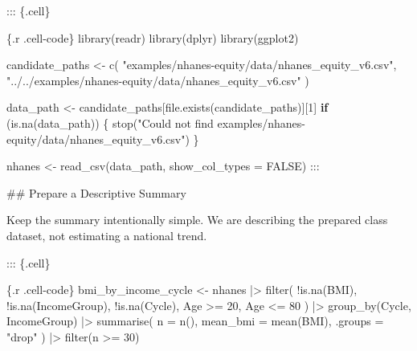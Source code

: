 \documentclass[
  letterpaper,
  DIV=11,
  numbers=noendperiod,
  oneside]{scrreprt}
\newenvironment{Shaded}{\begin{snugshade}}{\end{snugshade}}
\newcommand{\AttributeTok}[1]{\textcolor[rgb]{0.40,0.45,0.13}{#1}}
\newcommand{\ConstantTok}[1]{\textcolor[rgb]{0.56,0.35,0.01}{#1}}
\newcommand{\ControlFlowTok}[1]{\textcolor[rgb]{0.00,0.23,0.31}{\textbf{#1}}}
\newcommand{\DecValTok}[1]{\textcolor[rgb]{0.68,0.00,0.00}{#1}}
\newcommand{\FunctionTok}[1]{\textcolor[rgb]{0.28,0.35,0.67}{#1}}
\newcommand{\InformationTok}[1]{\textcolor[rgb]{0.37,0.37,0.37}{#1}}
\newcommand{\NormalTok}[1]{\textcolor[rgb]{0.00,0.23,0.31}{#1}}
\newcommand{\OtherTok}[1]{\textcolor[rgb]{0.00,0.23,0.31}{#1}}
\newcommand{\SpecialCharTok}[1]{\textcolor[rgb]{0.37,0.37,0.37}{#1}}
\newcommand{\StringTok}[1]{\textcolor[rgb]{0.13,0.47,0.30}{#1}}
\begin{document}
\begin{Shaded}
\begin{Highlighting}[numbers=left,,]
\NormalTok{::: \{.cell\}}

\InformationTok{\textasciigrave{}\textasciigrave{}\textasciigrave{}\{.r .cell{-}code\}}
\FunctionTok{library}\NormalTok{(readr)}
\FunctionTok{library}\NormalTok{(dplyr)}
\FunctionTok{library}\NormalTok{(ggplot2)}

\NormalTok{candidate\_paths }\OtherTok{\textless{}{-}} \FunctionTok{c}\NormalTok{(}
  \StringTok{"examples/nhanes{-}equity/data/nhanes\_equity\_v6.csv"}\NormalTok{,}
  \StringTok{"../../examples/nhanes{-}equity/data/nhanes\_equity\_v6.csv"}
\NormalTok{)}

\NormalTok{data\_path }\OtherTok{\textless{}{-}}\NormalTok{ candidate\_paths[}\FunctionTok{file.exists}\NormalTok{(candidate\_paths)][}\DecValTok{1}\NormalTok{]}
\ControlFlowTok{if}\NormalTok{ (}\FunctionTok{is.na}\NormalTok{(data\_path)) \{}
  \FunctionTok{stop}\NormalTok{(}\StringTok{"Could not find examples/nhanes{-}equity/data/nhanes\_equity\_v6.csv"}\NormalTok{)}
\NormalTok{\}}

\NormalTok{nhanes }\OtherTok{\textless{}{-}} \FunctionTok{read\_csv}\NormalTok{(data\_path, }\AttributeTok{show\_col\_types =} \ConstantTok{FALSE}\NormalTok{)}
\InformationTok{\textasciigrave{}\textasciigrave{}\textasciigrave{}}
\NormalTok{:::}


\FunctionTok{\#\# Prepare a Descriptive Summary}

\NormalTok{Keep the summary intentionally simple. We are describing the prepared class dataset, not estimating a national trend.}


\NormalTok{::: \{.cell\}}

\InformationTok{\textasciigrave{}\textasciigrave{}\textasciigrave{}\{.r .cell{-}code\}}
\NormalTok{bmi\_by\_income\_cycle }\OtherTok{\textless{}{-}}\NormalTok{ nhanes }\SpecialCharTok{|\textgreater{}}
  \FunctionTok{filter}\NormalTok{(}
    \SpecialCharTok{!}\FunctionTok{is.na}\NormalTok{(BMI),}
    \SpecialCharTok{!}\FunctionTok{is.na}\NormalTok{(IncomeGroup),}
    \SpecialCharTok{!}\FunctionTok{is.na}\NormalTok{(Cycle),}
\NormalTok{    Age }\SpecialCharTok{\textgreater{}=} \DecValTok{20}\NormalTok{,}
\NormalTok{    Age }\SpecialCharTok{\textless{}=} \DecValTok{80}
\NormalTok{  ) }\SpecialCharTok{|\textgreater{}}
  \FunctionTok{group\_by}\NormalTok{(Cycle, IncomeGroup) }\SpecialCharTok{|\textgreater{}}
  \FunctionTok{summarise}\NormalTok{(}
    \AttributeTok{n =} \FunctionTok{n}\NormalTok{(),}
    \AttributeTok{mean\_bmi =} \FunctionTok{mean}\NormalTok{(BMI),}
    \AttributeTok{.groups =} \StringTok{"drop"}
\NormalTok{  ) }\SpecialCharTok{|\textgreater{}}
  \FunctionTok{filter}\NormalTok{(n }\SpecialCharTok{\textgreater{}=} \DecValTok{30}\NormalTok{)}


\end{Highlighting}
\end{Shaded}
\end{document}
